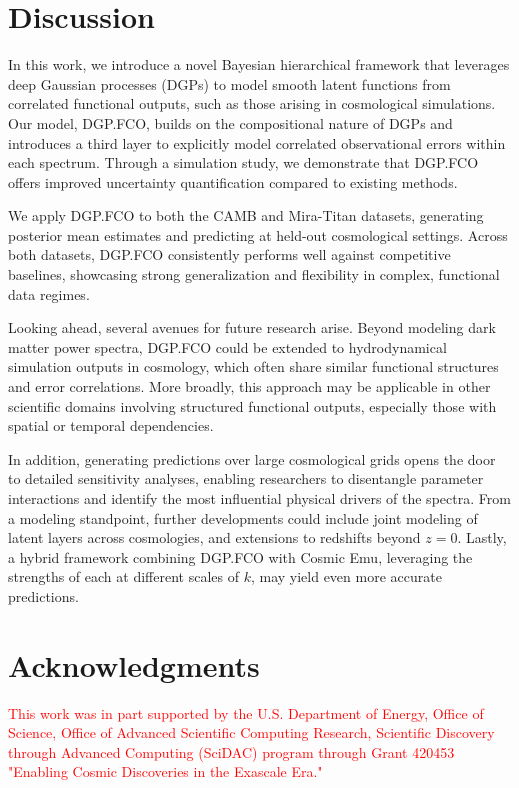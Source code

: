 \documentclass[11pt]{article}
\begin{document}
\section{Discussion}
\label{sec:disc}

In this work, we introduce a novel Bayesian hierarchical framework that leverages deep 
Gaussian processes (DGPs) to model smooth latent functions from correlated functional outputs, 
such as those arising in cosmological simulations. Our model, DGP.FCO, builds on the compositional nature 
of DGPs and introduces a third layer to explicitly model correlated observational errors within 
each spectrum. Through a simulation study, we demonstrate that DGP.FCO offers improved uncertainty 
quantification compared to existing methods.

We apply DGP.FCO to both the CAMB and Mira-Titan datasets, generating posterior mean estimates 
and predicting at held-out cosmological settings. Across both datasets, DGP.FCO 
consistently performs well against competitive baselines, showcasing strong generalization and 
flexibility in complex, functional data regimes.

Looking ahead, several avenues for future research arise. Beyond modeling dark matter power 
spectra, DGP.FCO could be extended to hydrodynamical simulation outputs in cosmology, which 
often share similar functional structures and error correlations. More broadly, this approach may be 
applicable in other scientific domains involving structured functional outputs, especially those 
with spatial or temporal dependencies.

In addition, generating predictions over large cosmological grids opens the door to detailed 
sensitivity analyses, enabling researchers to disentangle parameter interactions and identify 
the most influential physical drivers of the spectra. From a modeling standpoint, further 
developments could include joint modeling of latent layers across cosmologies, and extensions 
to redshifts beyond $z=0$. Lastly, a hybrid framework combining DGP.FCO with Cosmic Emu, leveraging 
the strengths of each at different scales of $k$, may yield even more accurate predictions.

\section{Acknowledgments}
\label{sec:ack}

\textcolor{red}{This work was in part supported by the U.S. Department
of Energy, Office of Science, Office of Advanced Scientific Computing Research, 
Scientific Discovery through Advanced Computing (SciDAC) program through 
Grant 420453 "Enabling Cosmic Discoveries in the Exascale Era."}
\end{document}
